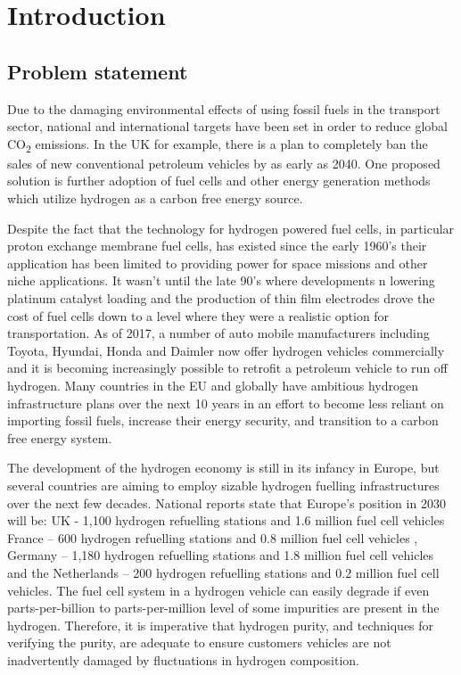 \chapter{Introduction}
\section{Problem statement}
Due to the damaging environmental effects of using fossil fuels in the transport sector, national and 
international targets have been set in order to reduce global CO\textsubscript{2} emissions.
In the UK for example, there is a plan to completely ban the sales of new conventional petroleum vehicles 
by as early as 2040. 
\cite{DepartmentforEnvironment2017} 
One proposed solution is further adoption of fuel cells and other energy generation methods which utilize
hydrogen as a carbon free energy source. 

Despite the fact that the technology for hydrogen powered fuel cells, in particular proton exchange 
membrane fuel cells, has existed since the early 1960’s their application has been limited to providing 
power for space missions and other niche applications. It wasn’t until the late 90’s where developments 
n lowering platinum catalyst loading and the production of thin film electrodes drove the cost of fuel 
cells down to a level where they were a realistic option for transportation. As of 2017, a number of auto 
mobile manufacturers including Toyota,\cite{Toyota2015} Hyundai, \cite{Hyundai2015} Honda \cite{Honda} 
and Daimler \cite{Mohrdieck2014} now offer hydrogen vehicles commercially and it is becoming 
increasingly possible to retrofit a petroleum vehicle to run off hydrogen.\cite{FCell2016} 
Many countries in the EU and globally have ambitious hydrogen infrastructure plans over the next 
10 years in an effort to become less reliant on importing fossil fuels, increase their energy security,
and transition to a carbon free energy system.

The development of the hydrogen economy is still in its infancy in Europe, but several 
countries are aiming to employ sizable hydrogen fuelling infrastructures over the next few decades. 
National reports state that Europe’s position in 2030 will be: UK - 1,100 hydrogen refuelling stations
and 1.6 million fuel cell vehicles \cite{UKH2Mobility2013} France – 600 hydrogen refuelling stations 
and 0.8 million fuel cell vehicles \cite{Summerton2015}, Germany – 1,180 hydrogen refuelling stations \cite{Hayter2014} 
and 1.8 million fuel cell vehicles  and the Netherlands – 200 hydrogen refuelling stations and 0.2 million fuel cell
vehicles. \cite{Hayter2014} The fuel cell system in a hydrogen vehicle can easily degrade if even 
parts-per-billion to parts-per-million level of some impurities are present in the hydrogen. 
Therefore, it is imperative that hydrogen purity, and techniques for verifying the purity, 
are adequate to ensure customers vehicles are not inadvertently damaged by fluctuations in hydrogen 
composition. 

